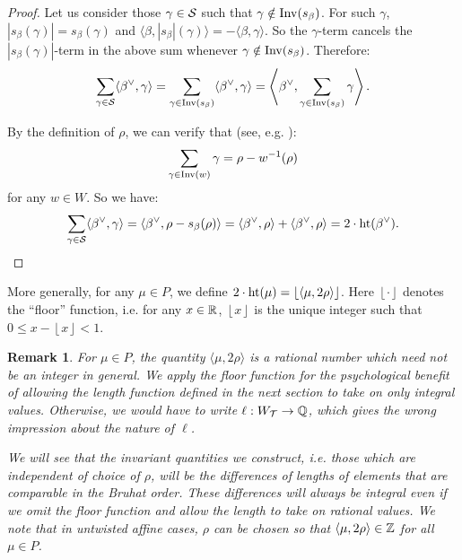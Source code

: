 \documentclass[10pt]{amsart}
\newtheorem{rema}[theo]{Remark}
\newcommand{\floor}[1]{\left\lfloor #1 \right\rfloor}
\begin{document}
\begin{proof}
Let us consider those $\gamma \in \mathcal{S}$ such that $\gamma \notin \operatorname{Inv}(s_\beta)$. For such $\gamma$, $|s_\beta(\gamma)| = s_\beta(\gamma)$ and $\langle \beta, |s_\beta|(\gamma)\rangle = - \langle \beta, \gamma \rangle$. So the $\gamma$-term cancels the $|s_\beta(\gamma)|$-term in the above sum whenever $\gamma \notin \operatorname{Inv}(s_\beta)$. Therefore:
\[
\sum_{\gamma \in \mathcal{S}} \langle \beta^\vee, \gamma \rangle = \sum_{\gamma \in \operatorname{Inv}(s_\beta)} \langle \beta^\vee, \gamma \rangle = \left\langle \beta^\vee, \sum_{\gamma \in \operatorname{Inv}(s_\beta)} \gamma \right\rangle.
\]

By the definition of $\rho$, we can verify that (see, e.g. \cite[Exercise~3.12]{K}):
\begin{equation}
\label{E:rho-wrho}
\sum_{\gamma \in \Inv(w)} \gamma = \rho - w^{-1}(\rho)
\end{equation}
for any $w\in W$. So we have:
\[
\sum_{\gamma \in \mathcal{S}} \langle \beta^\vee, \gamma \rangle = \langle \beta^\vee, \rho - s_\beta(\rho) \rangle = \langle \beta^\vee, \rho \rangle + \langle \beta^\vee, \rho \rangle = 2 \cdot \operatorname{ht}(\beta^\vee). \qedhere
\]
\end{proof}

More generally, for any $\mu\in P$, we define $2\cdot \height(\mu)=\floor{\langle \mu,2\rho\rangle}$. Here $\floor{\cdot}$ denotes the ``floor'' function, i.e. for any $x \in \mathbb{R}$, $\floor{x}$ is the unique integer such that $0 \leq x - \floor{x} < 1$.

\begin{rema}
For $\mu\in P$, the quantity $\langle \mu,2\rho \rangle$ is a rational number which need not be an integer in general. We apply the floor function for the psychological benefit of allowing the length function defined in the next section to take on only integral values. Otherwise, we would have to write $\ell: W_{\mathcal{T}} \rightarrow \mathbb{Q}$, which gives the wrong impression about the nature of $\ell$.

We will see that the invariant quantities we construct, i.e. those which are independent of choice of $\rho$, will be the \emph{differences} of lengths of elements that are comparable in the Bruhat order. These differences will always be integral even if we omit the floor function and allow the length to take on rational values. We note that in untwisted affine cases, $\rho$ can be chosen so that $\langle \mu, 2\rho\rangle \in \mathbb{Z}$ for all $\mu \in P$.
\end{rema}
\end{document}
